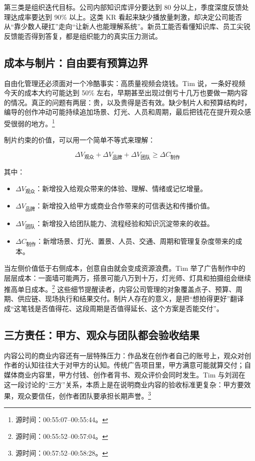 第三类是组织迭代目标。公司内部知识库评分要达到 80 分以上，季度深度反馈处理达成率要达到 90\% 以上。这类 KR 看起来缺少播放量刺激，却决定公司能否从“靠少数人硬扛”走向“让新人也能理解系统”。新员工能否看懂知识库、员工尖锐反馈能否得到答复，都是组织能力的真实压力测试。

\subsection{成本与制片：自由要有预算边界}

自由化管理还必须面对一个冷酷事实：高质量视频会烧钱。Tim 说，一条好视频今天的成本大约可能达到 50\% 左右，早期甚至出现过倒亏十几万也要做一期内容的情况。真正的问题有两层：贵，以及贵得是否有效。缺少制片人和预算结构时，编导的创作冲动可能持续追加场景、灯光、人员和周期，最后把钱花在提升观众感受很弱的地方。\footnote{源时间：00:55:07--00:55:44。}

制片约束的价值，可以用一个简单不等式来理解：

$$
\Delta V_{\text{观众}} + \Delta V_{\text{品牌}} + \Delta V_{\text{团队}} \geq \Delta C_{\text{制作}}
$$

其中：
\begin{itemize}
  \item $\Delta V_{\text{观众}}$：新增投入给观众带来的体验、理解、情绪或记忆增量。
  \item $\Delta V_{\text{品牌}}$：新增投入给甲方或商业合作带来的可信表达和传播价值。
  \item $\Delta V_{\text{团队}}$：新增投入给团队能力、流程经验和知识沉淀带来的收益。
  \item $\Delta C_{\text{制作}}$：新增场景、灯光、置景、人员、交通、周期和管理复杂度带来的成本。
\end{itemize}

当左侧价值低于右侧成本，创意自由就会变成资源浪费。Tim 举了广告制作中的层层成本：一面墙可能两万，搭景可能八万到十万，灯光师、灯具和拍摄组会继续推高单日成本。\footnote{源时间：00:55:52--00:57:04。} 这些细节提醒读者，内容公司管理的对象覆盖点子、预算、周期、供应链、现场执行和结果交付。制片人存在的意义，是把“想拍得更好”翻译成“这笔钱是否值得花、这段周期是否值得延长、这个方案是否能交付”。

\subsection{三方责任：甲方、观众与团队都会验收结果}

内容公司的商业内容还有一层特殊压力：作品发在创作者自己的账号上，观众对创作者的认知往往大于对甲方的认知。传统广告项目里，甲方满意可能就算交付；自媒体商业内容里，甲方付钱、创作者背书、观众评价会同时发生。Tim 与刘润在这一段讨论的“三方”关系，本质上是在说明商业内容的验收标准更复杂：甲方要效果，观众要信任，创作者团队要承担长期声誉。\footnote{源时间：00:57:52--00:58:28。}

